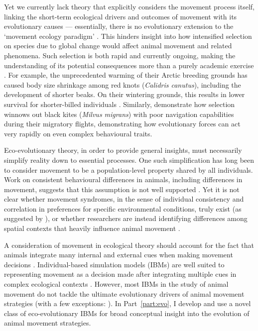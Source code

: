 Yet we currently lack theory that explicitly considers the movement process itself, linking the short-term ecological drivers and outcomes of movement with its evolutionary causes --- essentially, there is no evolutionary extension to the `movement ecology paradigm' \citep{holyoak2008,nathan2008a}.
This hinders insight into how intensified selection on species due to global change would affect animal movement and related phenomena.
Such selection is both rapid and currently ongoing, making the understanding of its potential consequences more than a purely academic exercise \parencite{bonnet2022}.
For example, the unprecedented warming of their Arctic breeding grounds has caused body size shrinkage among red knots (\emph{Calidris canutus}), including the development of shorter beaks.
On their wintering grounds, this results in lower survival for shorter-billed individuals \citep[e.g.][]{vangils2016}.
Similarly, \textcite{sergio2022} demonstrate how selection winnows out black kites (\emph{Milvus migrans}) with poor navigation capabilities during their migratory flights, demonstrating how evolutionary forces can act very rapidly on even complex behavioural traits.

Eco-evolutionary theory, in order to provide general insights, must necessarily simplify reality down to essential processes.
One such simplification has long been to consider movement to be a population-level property shared by all individuals.
Work on consistent behavioural differences in animals, including differences in movement, suggests that this assumption is not well supported \citep{spiegel2017,shaw2020,stuber2022,webber2018,webber2020,abrahms2017}.
Yet it is not clear whether movement syndromes, in the sense of individual consistency and correlation in preferences for specific environmental conditions, truly exist (as suggested by \cite{stuber2022}), or whether researchers are instead identifying differences among spatial contexts that heavily influence animal movement \parencite{spiegel2022}.

A consideration of movement in ecological theory should account for the fact that animals integrate many internal and external cues when making movement decisions \citep{nathan2008a}.
Individual-based simulation models (IBMs) are well suited to representing movement as a decision made after integrating multiple cues in complex ecological contexts \citep{huston1988,deangelis2019}.
However, most IBMs in the study of animal movement do not tackle the ultimate evolutionary drivers of animal movement strategies (with a few exceptions: \cite{getz2015,getz2016,netz2021}).
In Part~\ref{part:evo}, I develop and use a novel class of eco-evolutionary IBMs for broad conceptual insight into the evolution of animal movement strategies.

